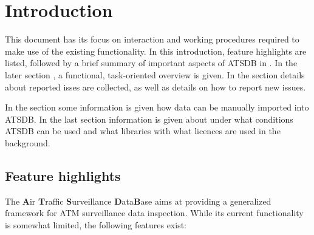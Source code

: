 \chapter{Introduction}

This document has its focus on interaction and working procedures required to make use of the existing
functionality. In this introduction, feature highlights are listed, followed by a brief summary of important aspects of  ATSDB in . In the later section , a functional, task-oriented overview is given. In the section  details about reported isses are collected, as well as details on how to report new issues.

In the section  some information is given how data can be manually imported into ATSDB. In the last section  information is given about under what conditions ATSDB can be used and what libraries with what licences are used in the background.

\section{Feature highlights}

The \textbf{A}ir \textbf{T}raffic \textbf{S}urveillance \textbf{D}ata\textbf{B}ase aims at providing a generalized framework for ATM surveillance data inspection. While its current functionality is somewhat limited, the following features exist:\\\\

